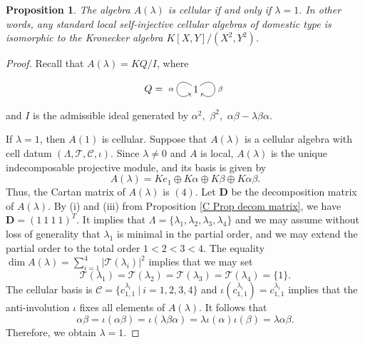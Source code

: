 \documentclass[12pt]{amsart}
\newtheorem{prop}[thm]{Proposition}
\numberwithin{equation}{thm}
\newcommand\bD{\mathbf D}
\newcommand\cC{\mathcal{C}}
\newcommand\cT{\mathcal{T}}
\newcommand\la{\lambda}
\newcounter{ni}
\begin{document}
\begin{prop}
\label{D prop local}
The algebra $A(\lambda)$ is cellular if and only if $\lambda=1$. 
In other words, any standard local self-injective cellular algebras of domestic type is isomorphic to the Kronecker algebra $K[X,Y]/(X^2,Y^2)$. 
\end{prop} 
\begin{proof}
Recall that $A(\lambda)=KQ/I$, where 
\[Q=\begin{xy}
(0,0)*[o]+{1}="1",
\SelectTips{eu}{}
\ar @(lu,ld)"1";"1"_{\alpha}
\ar @(ru,rd)"1";"1"^{\beta}
\end{xy}\] 
and $I$ is the admissible ideal generated by $\alpha^{2},$ $\beta^{2},$ $\alpha\beta-\lambda\beta\alpha$.

If $\lambda=1$, then $A(1)$ is cellular. 
Suppose that $A(\lambda)$ is a cellular algebra with cell datum $(\Lambda,\cT,\cC,\iota)$. 
Since $\lambda\neq 0$ and $A$ is local, $A(\lambda)$ is the unique indecomposable projective module, and its basis is given by
\[ A(\la) = Ke_1\oplus K\alpha \oplus K\beta\oplus K\alpha\beta. \]
Thus, the Cartan matrix of $A(\lambda)$ is $(4)$. 
Let $\bD$ be the decomposition matrix of $A(\lambda)$. 
By (i) and (iii) from Proposition \ref{C Prop decom matrix}, we have 
$\bD=(1\ 1\ 1\ 1)^T$. It implies that $\Lambda=\{\lambda_1, \lambda_2, \lambda_3, \lambda_4\}$ and 
we may assume without loss of generality that $\lambda_1$ is minimal in the partial order, and we may extend the partial order 
to the total order $1 < 2 < 3 < 4$. The equality $\dim A(\lambda)=\sum_{i=1}^4 |\cT(\lambda_i)|^{2}$ implies that we may set
\[ \cT(\lambda_1)=\cT(\lambda_2)=\cT(\lambda_3)=\cT(\lambda_4)=\{1\}. \]
The cellular basis is $\cC=\{c^{\lambda_i}_{1,1}\ |\ i=1,2,3,4\}$ and $\iota(c^{\lambda_i}_{1,1})=c^{\lambda_i}_{1,1}$
implies that the anti-involution $\iota$ fixes all elements of $A(\lambda)$. It follows that
\[ \alpha\beta=\iota(\alpha\beta)=\iota(\lambda\beta\alpha)=\lambda\iota(\alpha)\iota(\beta)=\lambda\alpha\beta. \]
Therefore, we obtain $\lambda=1$.
\end{proof}

\end{document}
